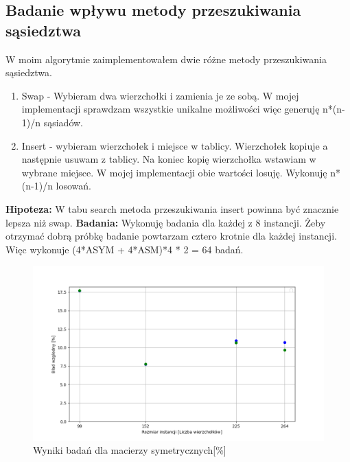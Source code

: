 \documentclass{article}
\begin{document}
      \subsection{Badanie wpływu metody przeszukiwania sąsiedztwa} 
        W moim algorytmie zaimplementowałem dwie różne metody przeszukiwania sąsiedztwa.
        \begin{enumerate}
          \item Swap - Wybieram dwa wierzchołki i zamienia je ze sobą. W mojej implementacji
          sprawdzam wszystkie unikalne możliwości więc generuję n*(n-1)/n sąsiadów.
          \item Insert - wybieram wierzchołek i miejsce w tablicy. Wierzchołek kopiuje a następnie 
          usuwam z tablicy. Na koniec kopię wierzchołka wstawiam w wybrane miejsce. W mojej 
          implementacji obie wartości losuję. Wykonuję n*(n-1)/n losowań.
        \end{enumerate}
        \textbf{Hipoteza: } W tabu search metoda przeszukiwania insert powinna być znacznie lepsza
        niż swap.
        \textbf{Badania: } Wykonuję badania dla każdej z 8 instancji. Żeby otrzymać dobrą próbkę 
        badanie powtarzam cztero krotnie dla każdej instancji. Więc wykonuje (4*ASYM + 4*ASM)*4 * 2 = 64
        badań.
        \FloatBarrier
        
        \FloatBarrier
        \begin{figure}[ht]
          \centering
          \includegraphics[width=\textwidth]{src/plots/symTsNeighMet.png}
          \caption{Wyniki badań dla macierzy symetrycznych[\%]}
          \label{fig:symNeighg}
        \end{figure}
\end{document}
